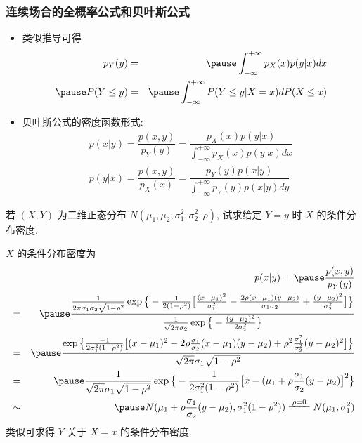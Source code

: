 \begin{frame}
	\frametitle{连续场合的全概率公式和贝叶斯公式}
	\begin{itemize}[<+-|alert@+>]
		\item 类似推导可得
		\begin{eqnarray*}
			p_Y(y)&=&\pause \int_{-\infty}^{+\infty}p_X(x)p(y|x)dx \\
			\pause P(Y\le y)&=& \pause \int_{-\infty}^{+\infty}P(Y\le y|X=x)dP(X\le x)
		\end{eqnarray*}
		\item 贝叶斯公式的密度函数形式:
		\begin{eqnarray*}
			p(x|y)=\dfrac{p(x,y)}{p_Y(y)}=\dfrac{p_X(x)p(y|x)}{\int_{-\infty}^{+\infty}p_X(x)p(y|x)dx}\\
			p(y|x)=\dfrac{p(x,y)}{p_X(x)}=\dfrac{p_Y(y)p(x|y)}{\int_{-\infty}^{+\infty}p_Y(y)p(x|y)dy}
		\end{eqnarray*}

	\end{itemize}
\end{frame}


\begin{frame}
	\begin{exam}
		若 $(X,Y)$ 为二维正态分布 $N (\mu_1,\mu_2,\sigma_1^2,\sigma_2^2,\rho)$, 试求给定 $Y=y$ 时 $X$ 的条件分布密度.\\
	\end{exam}


	\pause\jieda $X$ 的条件分布密度为
	\begin{eqnarray*}
		&&\hspace{-0.8cm}p(x|y)=\pause \dfrac{p(x,y)}{p_Y(y)}\\
		&=&\pause  \dfrac{\frac{1}{2\pi \sigma_1\sigma_2\sqrt{1-\rho^2}}\exp\big\{-\frac{1}{2(1-\rho^2)}\big[\frac{(x-\mu_1)^2}{\sigma_1^2}-\frac{2\rho(x-\mu_1)(y-\mu_2)}{\sigma_1\sigma_2}+\frac{(y-\mu_2)^2}{\sigma_2^2}\big]\big\}}{\frac{1}{\sqrt{2\pi}\sigma_2}\exp\big\{-\frac{(y-\mu_2)^2}{2\sigma_2^2}\big\}}\\
		&=&\pause \frac{\exp\big\{\frac{-1}{2\sigma_1^2(1-\rho^2)}\big[(x-\mu_1)^2-2\rho\frac{\sigma_1}{\sigma_2}(x-\mu_1)(y-\mu_2)+\rho^2\frac{\sigma_1^2}{\sigma_2^2}(y-\mu_2)^2\big]\big\}}{\sqrt{2\pi} \sigma_1\sqrt{1-\rho^2}}\\
		&=&\pause \frac{1}{\sqrt{2\pi} \sigma_1\sqrt{1-\rho^2}}\exp\big\{-\frac{1}{2\sigma_1^2(1-\rho^2)}\big[x-(\mu_1+\rho\frac{\sigma_1}{\sigma_2}(y-\mu_2)\big]^2\big\}\\
		&\sim&\pause  N(\mu_1+\rho\frac{\sigma_1}{\sigma_2}(y-\mu_2),\sigma_1^2(1-\rho^2)) \xlongequal{\rho=0} N(\mu_1,\sigma_1^2)
	\end{eqnarray*}
	\pause 类似可求得 $Y$ 关于 $X=x$ 的条件分布密度.
\end{frame}

